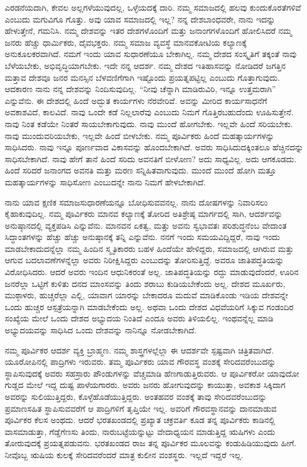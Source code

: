 ಎರಡನೆಯದಾಗಿ, ಕೇವಲ ಅಲ್ಲಗಳೆಯುವುದಲ್ಲ, ಒಳ್ಳೆಯದಕ್ಕೆ ದಾರಿ. ನಮ್ಮ ಸಮಾಜದಲ್ಲಿ ಹಲವು ಕುಂದುಕೊರತೆಗಳಿವೆ ಎಂಬುದು ಮಗುವಿಗೂ ಗೊತ್ತು. ಅವು ಯಾವ ಸಮಾಜದಲ್ಲಿ ಇಲ್ಲ? ನನ್ನ ದೇಶಬಾಂಧವರೇ, ನಾನು ಇದನ್ನು ಹೇಳುತ್ತೇನೆ, ಗಮನಿಸಿ. ನಮ್ಮ ದೇಶವನ್ನು ಇತರ ದೇಶಗಳೊಂದಿಗೆ ಮತ್ತು ಜನಾಂಗಗಳೊಂದಿಗೆ ಹೋಲಿಸಿದರೆ ನಮ್ಮ ಜನರು ಹೆಚ್ಚು ಧಾರ್ಮಿಕರು, ದೈವಭಕ್ತರು. ನಮ್ಮ ಸಮಾಜ ವ್ಯವಸ್ಥೆ ಮಾನವಕೋಟಿಯ ಕಲ್ಯಾಣಕ್ಕೆ ಅನುಕೂಲಕರವಾಗಿದೆ. ನಮಗೆ ಇಂದು ಯಾವ ಸುಧಾರಣೆಯೂ ಬೇಕಾಗಿಲ್ಲ. ನಮ್ಮ ದೇಶದ ಸಂಸ್ಕೃತಿಗೆ ತಕ್ಕಂತೆ ನಾವು ಬೆಳೆಯಬೇಕು, ಅಭಿವೃದ್ಧಿಯಾಗಬೇಕು. ಇದೇ ನನ್ನ ಆದರ್ಶ. ನಮ್ಮ ದೇಶದ ಇತಿಹಾಸವನ್ನು ನೋಡಿದರೆ ಜಗತ್ತಿನ ಮತ್ತಾವ ದೇಶವೂ ಜನರ ಮನಸ್ಸಿನ ಬೆಳವಣಿಗೆಗಾಗಿ ಇಷ್ಟೊಂದು ಪ್ರಯತ್ನಪಟ್ಟಿಲ್ಲ ಎಂಬುದು ಗೊತ್ತಾಗುವುದು. ಆದಕಾರಣ ನಾನು ನನ್ನ ದೇಶವನ್ನು ನಿಂದಿಸುವುದಿಲ್ಲ. “ನೀವು ಚೆನ್ನಾಗಿ ಮಾಡಿರುವಿರಿ, ಇನ್ನೂ ಉತ್ತಮರಾಗಿ” ಎನ್ನುವೆನು. ಈ ದೇಶದಲ್ಲಿ ಹಿಂದೆ ಅದ್ಭುತ ಕಾರ್ಯಗಳು ನೆರವೇರಿವೆ. ಅವನ್ನು ಮೀರಿದ ಕಾರ್ಯಸಾಧನೆಗೆ ಅವಕಾಶವಿದೆ, ಕಾಲವಿದೆ. ನಾವು ಒಂದೇ ಕಡೆ ನಿಲ್ಲಲಾರೆವು ಎಂಬುದು ನಿಮಗೆ ಗೊತ್ತಿರಬಹುದೆಂದು ಊಹಿಸುತ್ತೇನೆ. ನಾವು ನಿಂತ ಕಡೆಯೇ ನಿಂತರೆ ಸಾಯಬೇಕಾಗುವುದು. ನಾವು ಮುಂದೆ ಹೋಗಬೇಕು. ಇಲ್ಲವೇ ಹಿಂದೆ ಸರಿಯಬೇಕು. ನಾವು ಮುಂದುವರಿಯಬೇಕು, ಇಲ್ಲವೇ ಹಿಂದೆ ಬೀಳಬೇಕು. ನಮ್ಮ ಪೂರ್ವಿಕರು ಹಿಂದೆ ಮಹತ್ಕಾರ್ಯಗಳನ್ನು ಸಾಧಿಸಿದರು. ನಾವು ಇನ್ನೂ ಪೂರ್ಣವಾದ ವಿಕಾಸವನ್ನು ಹೊಂದಬೇಕಾಗಿದೆ. ಅವರು ಸಾಧಿಸಿದುದಕ್ಕಿಂತಲೂ ಹೆಚ್ಚಿನದನ್ನು ಸಾಧಿಸಬೇಕಾಗಿದೆ. ನಾವು ಹೇಗೆ ತಾನೆ ಹಿಂದೆ ಸರಿದು ಅವನತಿಗೆ ಬೀಳೋಣ? ಅದು ಸಾಧ್ಯವಿಲ್ಲ. ಅದು ಆಗಕೂಡದು. ಹಿಂದೆ ಸರಿದರೆ ಜನಾಂಗದ ಅವನತಿ ಮತ್ತು ಮರಣ ಸನ್ನಿಹಿತವಾಗುವುದು. ಮುಂದೆ ಮುಂದೆ ಹೋಗಿ ಮತ್ತೂ ಮಹತ್ಕಾರ್ಯಗಳನ್ನು ಸಾಧಿಸೋಣ ಎಂಬುದನ್ನೇ ನಾನು ನಿಮಗೆ ಹೇಳಬೇಕಾಗಿದೆ. 

ನಾನು ಯಾವ ಕ್ಷಣಿಕ ಸಮಾಜಸುಧಾರಣೆಯನ್ನೂ ಬೋಧಿಸುವವನಲ್ಲ. ನಾನು ದೋಷಗಳನ್ನು ನಿವಾರಿಸಲು ಕೈಹಾಕುವುದಿಲ್ಲ. ನಮ್ಮ ಪೂರ್ವಿಕರು ಮಾನವ ಕಲ್ಯಾಣಕ್ಕೆ ತೋರಿದ ಅತಿಶ್ರೇಷ್ಠ ಮಾರ್ಗದಲ್ಲಿ ಸಾಗಿ, ಆದರ್ಶವನ್ನು ಅನುಷ್ಠಾನದಲ್ಲಿ ವ್ಯಕ್ತಪಡಿಸಿ ಎನ್ನುವೆನು. ಮಾನವನ ಏಕತ್ವ, ಮತ್ತು ಅವನು ಸ್ವಭಾವತಃ ಪರಿಶುದ್ಧನೆಂಬ ವೇದಾಂತ ಸಿದ್ಧಾಂತಗಳನ್ನು ಹೆಚ್ಚು ಹೆಚ್ಚು ಅನುಷ್ಠಾನಕ್ಕೆ ತನ್ನಿ ಎನ್ನುವೆನು. ನನಗೆ ಇಂದು ಸಮಯವಿದ್ದಿದ್ದರೆ, ನಾವು ಇಂದು ಮಾಡಬೇಕಾದುದನ್ನೆಲ್ಲಾ ನಮ್ಮ ಹಿಂದಿನ ಸ್ಮೃತಿಕಾರರು ಬಹಳ ಹಿಂದೆಯೇ ಹೇಳಿದ್ದರು, ಸಮಾಜದಲ್ಲಿ ಆಗಿರುವ ಮತ್ತು ಆಗುವ ಬದಲಾವಣೆಗಳನ್ನೆಲ್ಲಾ ಅವರು ನಿರೀಕ್ಷಿಸಿದ್ದರು ಎಂಬುದನ್ನು ತೋರಿಸುತ್ತಿದ್ದೆ. ಅವರೂ ಜಾತಿಪದ್ಧತಿಯನ್ನು ವಿರೋಧಿಸಿದರು. ಆದರೆ ಅವರು ಇಂದಿನ ಆಧುನಿಕರಂತೆ ಅಲ್ಲ. ಜಾತಿಪದ್ಧತಿಯನ್ನು ರದ್ದು ಮಾಡುವುದೆಂದರೆ, ಊರಿನ ಜನರೆಲ್ಲಾ ಒಟ್ಟಿಗೆ ಕುಳಿತು ದನದ ಮಾಂಸವನ್ನು ತಿಂದು ಶರಾಬು ಕುಡಿಯಬೇಕೆಂದು ಅಲ್ಲ. ದೇಶದ ಮೂರ್ಖರು, ಮುಠ್ಠಾಳರು, ಹುಚ್ಚರೆಲ್ಲಾ ಎಲ್ಲಿ, ಯಾವಾಗ ಯಾರನ್ನು ಬೇಕಾದರೂ ಮದುವೆ ಮಾಡಿಕೊಂಡು ಇಡಿಯ ದೇಶವನ್ನೇ ಒಂದು ಹುಚ್ಚರ ಆಸ್ಪತ್ರೆಯನ್ನಾಗಿ ಮಾಡಬೇಕೆಂದು ಅಲ್ಲ. ಅಥವಾ ಒಂದು ದೇಶದ ವಿಧವೆಯರಿಗೆ ಸಿಕ್ಕುವ ಗಂಡಂದಿರ ಸಂಖ್ಯೆಯ ಮೇಲೆ ಒಂದು ದೇಶದ ಅಭ್ಯುದಯ ನಿಂತಿದೆ ಎಂದೂ ಅವರು ತಿಳಿಯಲಿಲ್ಲ. ಇಂಥವನ್ನೆಲ್ಲ ಮಾಡಿ ಅಭ್ಯುದಯವನ್ನು ಸಾಧಿಸಿದ ಒಂದು ದೇಶವನ್ನು ನಾನಿನ್ನೂ ನೋಡಬೇಕಾಗಿದೆ. 

ನಮ್ಮ ಪೂರ್ವಿಕರ ಆದರ್ಶ ವ್ಯಕ್ತಿ ಬ್ರಾಹ್ಮಣ. ನಮ್ಮ ಶಾಸ್ತ್ರಗಳಲ್ಲೆಲ್ಲಾ ಈ ಆದರ್ಶವೇ ಸ್ಪಷ್ಟವಾಗಿ ಚಿತ್ರಿತವಾಗಿದೆ. ಯೂರೋಪಿನಲ್ಲಿ ಪಾದ್ರಿಗಳು ಇರುವರು. ತಮ್ಮ ಪೂರ್ವಿಕರು ಯಾವ ಗೌರವಸ್ಥ ವಂಶಕ್ಕೆ ಸೇರಿದವರೆಂಬುದನ್ನು ಸ್ಥಾಪಿಸುವುದಕ್ಕೆ ಅವರು ಸಹಸ್ರಾರು ಪೌಂಡುಗಳನ್ನು ವೆಚ್ಚಮಾಡಿ ಹೆಣಗಾಡುತ್ತಿರುವರು. ಆ ಪೂರ್ವಿಕರೋ ಯಾವುದೋ ಗುಡ್ಡದ ಮೇಲೆ ಇದ್ದ ದುಷ್ಟ ಪಾಳೆಯಗಾರರು. ಅವರು ಜನರು ಹೋಗುವುದನ್ನು ಕಾಯುತ್ತಾ, ಅವಕಾಶ ಸಿಕ್ಕಿದಾಗ ಅವರನ್ನು ಸುಲಿಯುತ್ತಿದ್ದರು, ಕೊಳ್ಳೆಹೊಡೆಯುತ್ತಿದ್ದರು. ಅಂತಹವರ ವಂಶಕ್ಕೆ ತಾವು ಸೇರಿದವರೆಂಬುದನ್ನು ಪ್ರಮಾಣಸಹಿತ ಸ್ಥಾಪಿಸುವವರೆಗೆ ಆ ಪಾದ್ರಿಗಳಿಗೆ ತೃಪ್ತಿಯೇ ಇಲ್ಲ. ಅವರಿಗೆ ಗೌರವಸ್ಥಾನವನ್ನು ದಾನಮಾಡುವ ಪೂರ್ವಿಕರ ಕೆಲಸ ಅಂಥದು. ಆದರೆ ಭರತಖಂಡದಲ್ಲಿ ಪ್ರಖ್ಯಾತ ಚಕ್ರವರ್ತಿ ಕೂಡ ತನ್ನ ಪೂರ್ವಿಕರು ಕಾಡಿನಲ್ಲಿ ವಾಸಮಾಡುತ್ತಾ, ಗೆಡ್ಡೆಗೆಣಸು ತಿಂದು, ನಾರುಬಟ್ಟೆಯನ್ನುಟ್ಟು ವೇದಾಧ್ಯಯನ ಮಾಡುತ್ತಿದ್ದ ಋಷಿಗಳು ಎಂದು ತೋರುವುದಕ್ಕೆ ಪ್ರಯತ್ನಪಡುವನು. ಭರತಖಂಡದ ರಾಜ ತನ್ನ ಪೂರ್ವಿಕರ ಮೂಲವನ್ನು ಕಂಡುಹಿಡಿಯುವುದು ಹೀಗೆ. ನೀವೊಬ್ಬ ಋಷಿಯ ಕುಲಕ್ಕೆ ಸೇರಿದವರೆಂದರೆ ಮಾತ್ರ ಕುಲೀನ ವಂಶಸ್ಥರು. ಇಲ್ಲದೆ ಇದ್ದರೆ ಇಲ್ಲ. 

